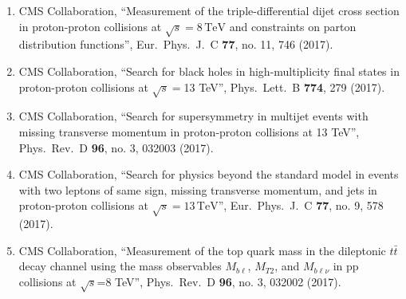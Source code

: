 \begin{itemize}
\begin{enumerate}
\item CMS Collaboration, ``Measurement of the triple-differential dijet cross section in proton-proton collisions at $\sqrt{s}=8\,\text {TeV} $ and constraints on parton distribution functions'', Eur.\ Phys.\ J.\ C {\bf 77}, no. 11, 746 (2017).

\item CMS Collaboration, ``Search for black holes in high-multiplicity final states in proton-proton collisions at $ \sqrt{s}=$13 TeV'', Phys.\ Lett.\ B {\bf 774}, 279 (2017).

\item CMS Collaboration, ``Search for supersymmetry in multijet events with missing transverse momentum in proton-proton collisions at 13 TeV'', Phys.\ Rev.\ D {\bf 96}, no. 3, 032003 (2017).

\item CMS Collaboration, ``Search for physics beyond the standard model in events with two leptons of same sign, missing transverse momentum, and jets in proton-proton collisions at $\sqrt{s} = 13\,\text {TeV} $'', Eur.\ Phys.\ J.\ C {\bf 77}, no. 9, 578 (2017).

\item CMS Collaboration, ``Measurement of the top quark mass in the dileptonic $t\bar{t}$ decay channel using the mass observables $M_{b\ell}$, $M_{T2}$, and $M_{b\ell\nu}$ in pp collisions at $\sqrt{s}$=8 TeV'', Phys.\ Rev.\ D {\bf 96}, no. 3, 032002 (2017).


\end{enumerate}
\end{itemize}
